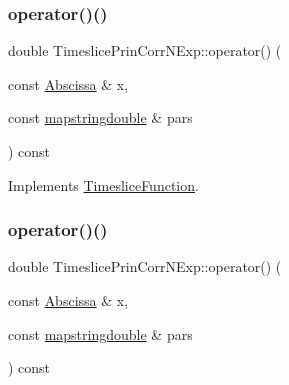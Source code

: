 \mbox{\label{classTimeslicePrinCorrNExp_a9a55af8256beba8993e5163bdab55571}} 
\subsubsection{\texorpdfstring{operator()()}{operator()()}\hspace{0.1cm}{\footnotesize\ttfamily [1/4]}}
{\footnotesize\ttfamily double Timeslice\+Prin\+Corr\+N\+Exp\+::operator() (\begin{DoxyParamCaption}\item[{const \mbox{\hyperlink{classAbscissa}{Abscissa}} \&}]{x,  }\item[{const \mbox{\hyperlink{lib_2fitting__lib_2includes_8h_a647b481c557c7966517f753340a81d13}{mapstringdouble}} \&}]{pars }\end{DoxyParamCaption}) const\hspace{0.3cm}{\ttfamily [virtual]}}



Implements \mbox{\hyperlink{classTimesliceFunction_ac4426035b36872933c70b5e0ad8cb4e3}{Timeslice\+Function}}.

\mbox{\label{classTimeslicePrinCorrNExp_a9a55af8256beba8993e5163bdab55571}} 
\subsubsection{\texorpdfstring{operator()()}{operator()()}\hspace{0.1cm}{\footnotesize\ttfamily [2/4]}}
{\footnotesize\ttfamily double Timeslice\+Prin\+Corr\+N\+Exp\+::operator() (\begin{DoxyParamCaption}\item[{const \mbox{\hyperlink{classAbscissa}{Abscissa}} \&}]{x,  }\item[{const \mbox{\hyperlink{lib_2fitting__lib_2includes_8h_a647b481c557c7966517f753340a81d13}{mapstringdouble}} \&}]{pars }\end{DoxyParamCaption}) const\hspace{0.3cm}{\ttfamily [virtual]}}



